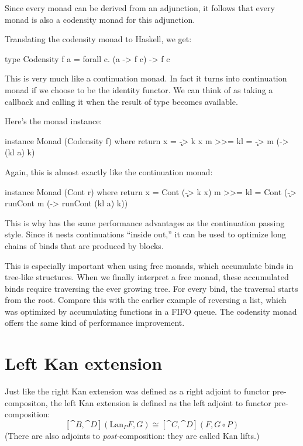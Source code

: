 \documentclass[DaoFP]{subfiles}
\begin{document}
Since every monad can be derived from an adjunction, it follows that every monad is also a codensity monad for this adjunction.

Translating the codensity monad to Haskell, we get:
 \begin{haskell}
type Codensity f a = forall c. (a -> f c) -> f c
 \end{haskell}
This is very much like a continuation monad. In fact it turns into continuation monad if we choose  to be the identity functor. We can think of  as taking a callback  and calling it when the result of type  becomes available. 

Here's the monad instance:
 \begin{haskell}
instance Monad (Codensity f) where
  return x = \k -> k x
  m >>= kl = \k -> m (\a -> (kl a) k)
 \end{haskell}
 Again, this is almost exactly like the continuation monad:
 \begin{haskell}
instance Monad (Cont r) where
  return x = Cont (\k -> k x)
  m >>= kl = Cont (\k -> runCont m (\a -> runCont (kl a) k))
\end{haskell}
This is why  has the same performance advantages as the continuation passing style. Since it nests continuations ``inside out,'' it can be used to optimize long chains of binds that are produced by  blocks. 

This is especially important when using free monads, which accumulate binds in tree-like structures. When we finally interpret a free monad, these accumulated binds require traversing the ever growing tree. For every bind, the traversal starts from the root. Compare this with the earlier example of reversing a list, which was optimized by accumulating functions in a FIFO queue. The codensity monad offers the same kind of performance improvement.

\section{Left Kan extension}

Just like the right Kan extension was defined as a right adjoint to functor pre-compositon, the left Kan extension is defined as the left adjoint to functor pre-composition:
\[ [\cat B, \cat D](\text{Lan}_P F , G) \cong  [\cat C, \cat D] (F, G \circ P) \]
 (There are also adjoints to \emph{post}-composition: they are called Kan lifts.)
\end{document}
